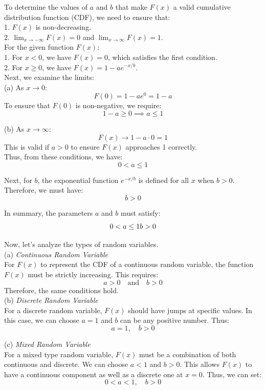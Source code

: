 \begin{solution}
To determine the values of \( a \) and \( b \) that make \( F(x) \) a valid cumulative distribution function (CDF), we need to ensure that:\\

1. \( F(x) \) is non-decreasing.\\
2. \( \lim_{x \to -\infty} F(x) = 0 \) and \( \lim_{x \to \infty} F(x) = 1 \).\\

For the given function \( F(x) \):\\

1. For \( x < 0 \), we have \( F(x) = 0 \), which satisfies the first condition.\\
2. For \( x \geq 0 \), we have \( F(x) = 1 - ae^{-x/b} \).\\

Next, we examine the limits:\\

(a) As \( x \to 0 \):
\[
F(0) = 1 - ae^{0} = 1 - a
\]
To ensure that \( F(0) \) is non-negative, we require:
\[
1 - a \geq 0 \implies a \leq 1
\]

(b) As \( x \to \infty \):
\[
F(x) \to 1 - a \cdot 0 = 1
\]
This is valid if \( a > 0 \) to ensure \( F(x) \) approaches 1 correctly.\\

Thus, from these conditions, we have:
\[
0 < a \leq 1
\]

Next, for \( b \), the exponential function \( e^{-x/b} \) is defined for all \( x \) when \( b > 0 \). Therefore, we must have:
\[
b > 0
\]

In summary, the parameters \( a \) and \( b \) must satisfy:
\[
0 < a \leq 1 \\
b > 0
\]

Now, let’s analyze the types of random variables.\\

(a) \textit{Continuous Random Variable}\\

For \( F(x) \) to represent the CDF of a continuous random variable, the function \( F(x) \) must be strictly increasing. This requires:
\[
a > 0 \quad \text{and} \quad b > 0
\]
Therefore, the same conditions hold.\\

(b) \textit{Discrete Random Variable}\\

For a discrete random variable, \( F(x) \) should have jumps at specific values. In this case, we can choose \( a = 1 \) and \( b \) can be any positive number. Thus:
\[
a = 1, \quad b > 0
\]

(c) \textit{Mixed Random Variable}\\

For a mixed type random variable, \( F(x) \) must be a combination of both continuous and discrete. We can choose \( a < 1 \) and \( b > 0 \). This allows \( F(x) \) to have a continuous component as well as a discrete one at \( x = 0 \). Thus, we can set:
\[
0 < a < 1, \quad b > 0
\]

\end{solution}

